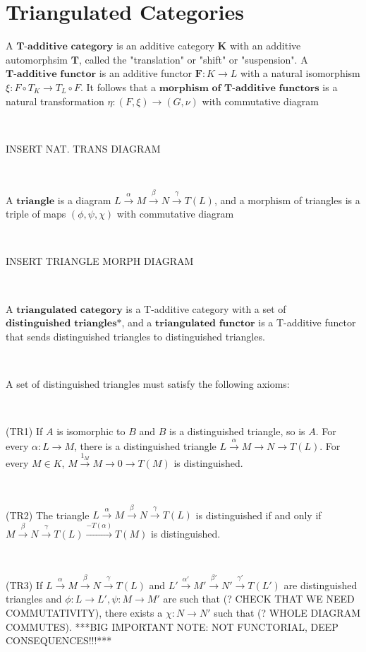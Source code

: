 \documentclass[12pt]{amsart}    %
\theoremstyle{definition}
\begin{document}
\section{Triangulated Categories}

A $\textbf{T-additive category}$ is an additive category $\textbf{K}$ with an additive automorphsim $\textbf{T}$, called the "translation" or "shift" or "suspension".  A $\textbf{T-additive functor}$ is an additive functor $\textbf{F}: K \rightarrow L$ with a natural isomorphism $\xi: F \circ T_K \rightarrow T_L \circ F$.  It follows that a $\textbf{morphism of T-additive functors}$ is a natural transformation $\eta: (F,\xi) \rightarrow (G, \nu)$ with commutative diagram

\

INSERT NAT. TRANS DIAGRAM

\

A $\textbf{triangle}$ is a diagram $L \xrightarrow{\alpha} M \xrightarrow{\beta} N \xrightarrow{\gamma} T(L)$, and a morphism of triangles is a triple of maps $(\phi, \psi, \chi)$ with commutative diagram

\

INSERT TRIANGLE MORPH DIAGRAM

\

A $\textbf{triangulated category}$ is a T-additive category with a set of $\textbf{distinguished triangles*}$, and a $\textbf{triangulated functor}$ is a T-additive functor that sends distinguished triangles to distinguished triangles.

\

A set of distinguished triangles must satisfy the following axioms:

\

(TR1) If $A$ is isomorphic to $B$ and $B$ is a distinguished triangle, so is $A$.  For every $\alpha: L \rightarrow M$, there is a distinguished triangle $L \xrightarrow{\alpha} M \rightarrow N \rightarrow T(L)$.  For every $M \in K$, $M \xrightarrow{1_M} M \rightarrow 0 \rightarrow T(M)$ is distinguished.

\

(TR2) The triangle $L \xrightarrow{\alpha} M \xrightarrow{\beta} N \xrightarrow{\gamma} T(L)$ is distinguished if and only if $M \xrightarrow{\beta} N \xrightarrow{\gamma} T(L) \xrightarrow{-T(\alpha)} T(M)$ is distinguished.

\

(TR3) If $L \xrightarrow{\alpha} M \xrightarrow{\beta} N \xrightarrow{\gamma} T(L)$ and $L' \xrightarrow{\alpha'} M' \xrightarrow{\beta'} N' \xrightarrow{\gamma'} T(L')$ are distinguished triangles and $\phi: L \rightarrow L', \psi: M \rightarrow M'$ are such that (? CHECK THAT WE NEED COMMUTATIVITY), there exists a $\chi: N \rightarrow N'$ such that (? WHOLE DIAGRAM COMMUTES).  ***BIG IMPORTANT NOTE: NOT FUNCTORIAL, DEEP CONSEQUENCES!!!***
\end{document}
